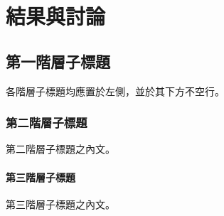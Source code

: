 \chapter{結果與討論}
\label{c:4}

\section{第一階層子標題}

各階層子標題均應置於左側，並於其下方不空行。

\subsection{第二階層子標題}

第二階層子標題之內文。

\subsubsection{第三階層子標題}

第三階層子標題之內文。

